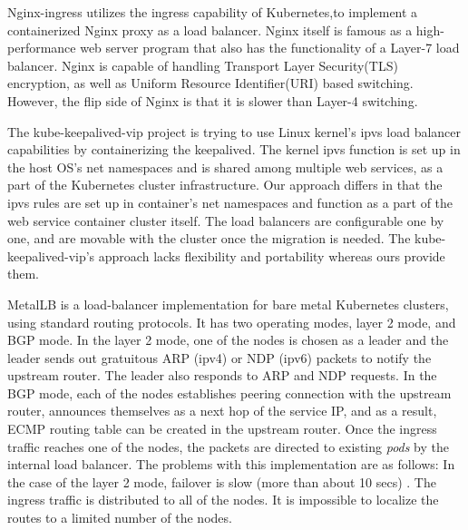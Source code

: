 Nginx-ingress\cite{Pleshakov2016,NginxInc2016} utilizes the ingress\cite{K8sIngress2017} capability of Kubernetes,to implement a containerized Nginx proxy as a load balancer.
Nginx itself is famous as a high-performance web server program that also has the functionality of a Layer-7 load balancer.
Nginx is capable of handling Transport Layer Security(TLS) encryption, as well as Uniform Resource Identifier(URI) based switching.
However, the flip side of Nginx is that it is slower than Layer-4 switching.

The kube-keepalived-vip\cite{Prashanth2016} project is trying to use Linux kernel's ipvs\cite{Zhang2000} 
load balancer capabilities by containerizing the keepalived\cite{ACassen2016}.
The kernel ipvs function is set up in the host OS's net namespaces and is shared among multiple web services, as a part of the Kubernetes cluster infrastructure.
Our approach differs in that the ipvs rules are set up in container's net namespaces 
and function as a part of the web service container cluster itself.
The load balancers are configurable one by one, and are  movable with the cluster once the migration is needed.
The kube-keepalived-vip's approach lacks flexibility and portability whereas ours provide them.

MetalLB \cite{metallb} is a load-balancer implementation for bare metal Kubernetes clusters, using standard routing protocols.
It has two operating modes, layer 2 mode, and BGP mode.
In the layer 2 mode, one of the nodes is chosen as a leader and the leader sends out gratuitous ARP (ipv4) or NDP (ipv6) packets to notify the upstream router.
The leader also responds to ARP and NDP requests.
In the BGP mode, each of the nodes establishes peering connection with the upstream router, announces themselves as a next hop of the service IP, and as a result, ECMP routing table can be created in the upstream router.
Once the ingress traffic reaches one of the nodes, the packets are directed to existing {\em pods} by the internal load balancer.
The problems with this implementation are as follows:
In the case of the layer 2 mode, failover is slow (more than about 10 secs) \cite{metallb}.
The ingress traffic is distributed to all of the nodes.
It is impossible to localize the routes to a limited number of the nodes.

